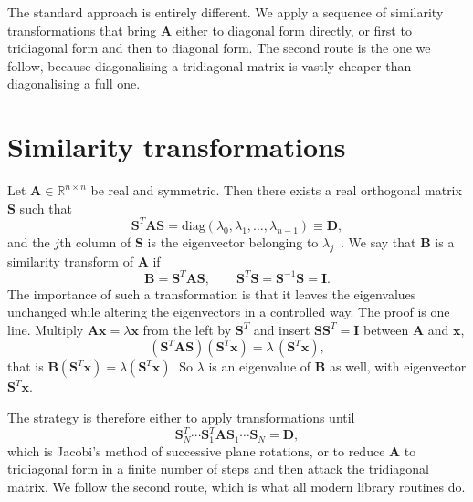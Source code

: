 The standard approach is entirely different.  We apply a sequence of
similarity transformations that bring $\bm{A}$ either to diagonal form
directly, or first to tridiagonal form and then to diagonal form.  The second
route is the one we follow, because diagonalising a tridiagonal matrix is
vastly cheaper than diagonalising a full one.

\section{Similarity transformations}
\label{sec:similarity}

Let $\bm{A}\in\mathbb{R}^{n\times n}$ be real and symmetric.  Then there
exists a real orthogonal matrix $\bm{S}$ such that
\begin{equation}
  \bm{S}^{T}\bm{A}\bm{S}
    = \mathrm{diag}(\lambda_0,\lambda_1,\dots,\lambda_{n-1}) \equiv \bm{D},
  \label{eq:1-diagonalise}
\end{equation}
and the $j$th column of $\bm{S}$ is the eigenvector belonging to
$\lambda_j$~\cite{golub1996}.  We say that $\bm{B}$ is a similarity transform
of $\bm{A}$ if
\begin{equation}
  \bm{B} = \bm{S}^{T}\bm{A}\bm{S},
  \qquad
  \bm{S}^{T}\bm{S} = \bm{S}^{-1}\bm{S} = \bm{I} .
  \label{eq:1-similar}
\end{equation}
The importance of such a transformation is that it leaves the eigenvalues
unchanged while altering the eigenvectors in a controlled way.  The proof is
one line.  Multiply $\bm{A}\bm{x}=\lambda\bm{x}$ from the left by $\bm{S}^{T}$
and insert $\bm{S}\bm{S}^{T}=\bm{I}$ between $\bm{A}$ and $\bm{x}$,
\begin{equation}
  (\bm{S}^{T}\bm{A}\bm{S})(\bm{S}^{T}\bm{x})
    = \lambda\,(\bm{S}^{T}\bm{x}),
  \label{eq:1-similarproof}
\end{equation}
that is $\bm{B}(\bm{S}^{T}\bm{x})=\lambda(\bm{S}^{T}\bm{x})$.  So $\lambda$ is
an eigenvalue of $\bm{B}$ as well, with eigenvector $\bm{S}^{T}\bm{x}$.

The strategy is therefore either to apply transformations until
\begin{equation}
  \bm{S}_N^{T}\cdots\bm{S}_1^{T}\bm{A}\bm{S}_1\cdots\bm{S}_N = \bm{D},
  \label{eq:1-seqsimilar}
\end{equation}
which is Jacobi's method of successive plane rotations, or to reduce $\bm{A}$
to tridiagonal form in a finite number of steps and then attack the
tridiagonal matrix.  We follow the second route, which is what all modern
library routines do.

